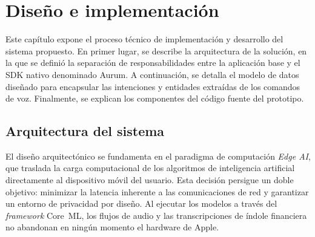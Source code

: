 \chapter{Diseño e implementación} %

\label{Chapter3}

Este capítulo expone el proceso técnico de implementación y desarrollo del sistema propuesto. En primer lugar, se describe la arquitectura de la solución, en la que se definió la separación de responsabilidades entre la aplicación base y el SDK nativo denominado Aurum. A continuación, se detalla el modelo de datos diseñado para encapsular las intenciones y entidades extraídas de los comandos de voz. Finalmente, se explican los componentes del código fuente del prototipo.





\section{Arquitectura del sistema}

El diseño arquitectónico se fundamenta en el paradigma de computación \textit{Edge AI}, que traslada la carga computacional de los algoritmos de inteligencia artificial directamente al dispositivo móvil del usuario. Esta decisión persigue un doble objetivo: minimizar la latencia inherente a las comunicaciones de red y garantizar un entorno de privacidad por diseño. Al ejecutar los modelos a través del \textit{framework} Core~ML, los flujos de audio y las transcripciones de índole financiera no abandonan en ningún momento el hardware de Apple.

